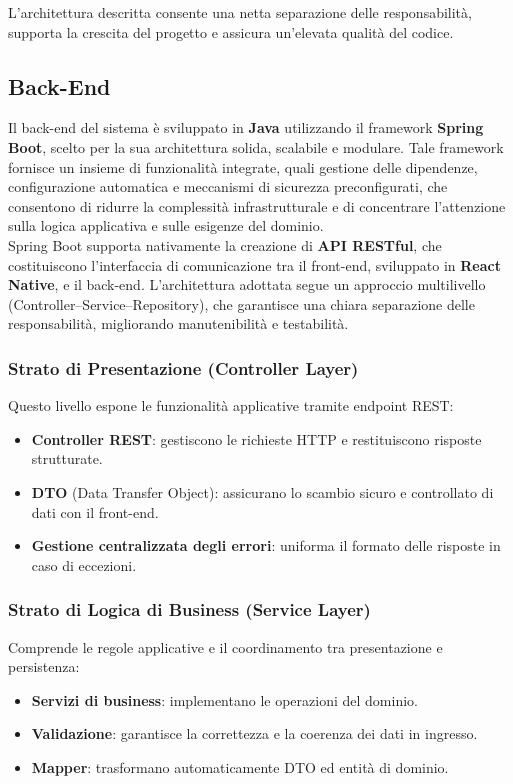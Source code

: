 \documentclass{book}
\begin{document}
L’architettura descritta consente una netta separazione delle responsabilità, supporta la crescita del progetto e assicura un’elevata qualità del codice.


\subsection{Back-End}
Il back-end del sistema è sviluppato in \textbf{Java} utilizzando il framework \textbf{Spring Boot}, scelto per la sua architettura solida, scalabile e modulare. Tale framework fornisce un insieme di funzionalità integrate, quali gestione delle dipendenze, configurazione automatica e meccanismi di sicurezza preconfigurati, che consentono di ridurre la complessità infrastrutturale e di concentrare l’attenzione sulla logica applicativa e sulle esigenze del dominio. \\
Spring Boot supporta nativamente la creazione di \textbf{API RESTful}, che costituiscono l’interfaccia di comunicazione tra il front-end, sviluppato in \textbf{React Native}, e il back-end. L’architettura adottata segue un approccio multilivello (Controller–Service–Repository), che garantisce una chiara separazione delle responsabilità, migliorando manutenibilità e testabilità.

\subsubsection{Strato di Presentazione (Controller Layer)}
Questo livello espone le funzionalità applicative tramite endpoint REST:
\begin{itemize}
    \item \textbf{Controller REST}: gestiscono le richieste HTTP e restituiscono risposte strutturate.
    \item \textbf{DTO} (Data Transfer Object): assicurano lo scambio sicuro e controllato di dati con il front-end.
    \item \textbf{Gestione centralizzata degli errori}: uniforma il formato delle risposte in caso di eccezioni.
\end{itemize}

\subsubsection{Strato di Logica di Business (Service Layer)}
Comprende le regole applicative e il coordinamento tra presentazione e persistenza:
\begin{itemize}
    \item \textbf{Servizi di business}: implementano le operazioni del dominio.
    \item \textbf{Validazione}: garantisce la correttezza e la coerenza dei dati in ingresso.
    \item \textbf{Mapper}: trasformano automaticamente DTO ed entità di dominio.
\end{itemize}
\end{document}
